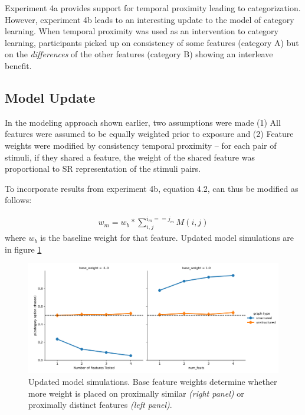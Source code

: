 Experiment 4a provides support for temporal proximity leading to categorization. However, experiment 4b leads to an interesting update to the model of category learning. When temporal proximity was used as an intervention to category learning, participants picked up on consistency of some features (category A) but on the \textit{differences} of the other features (category B) showing an interleave benefit. 

\subsection*{Model Update}
In the modeling approach shown earlier, two assumptions were made (1) All features were assumed to be equally weighted prior to exposure and (2) Feature weights were modified by consistency temporal proximity -- for each pair of stimuli, if they shared a feature, the weight of the shared feature was proportional to SR representation of the stimuli pairs.  

To incorporate results from experiment 4b, equation 4.2, can thus be modified as follows:

\begin{equation}
    \begin{aligned}
        w_m = w_b * \sum_{i, j}^{i_m == j_m} M(i, j)
    \end{aligned}
\end{equation}
where $w_b$ is the baseline weight for that feature. Updated model simulations are in figure \ref{fig:category-sr-sims-updated}

\begin{figure}
    \centering
    \label{fig:category-sr-sims-updated}
    \caption{Updated model simulations. Base feature weights determine whether more weight is placed on proximally similar \textit{(right panel)} or proximally distinct features \textit{(left panel)}.}
    \includegraphics[width = \textwidth]{chapter_notebooks/chapter_4/figures/cat_simulations_baseweights.png}
\end{figure}

